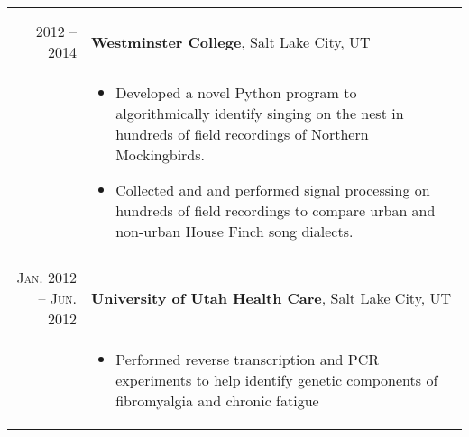 \documentclass[a4paper,10pt]{report}
\begin{document}
\begin{longtable}{r|p{10cm}}
{\begin{itemize}
		\end{itemize}
	} \vspace{-3.5mm}                                                                                     \\
	\multicolumn{2}{c}{}
	\\[-0.75em]
	\textsc{2012 -- 2014}            & \textbf{Westminster College}, Salt Lake City, UT                   \\
	                                 & \footnotesize{
		\vspace{-3.5mm}
		\begin{itemize}
			\setlength\itemsep{0em}
			\item Developed a novel Python program to algorithmically identify
			      singing on the nest in hundreds of field recordings of Northern Mockingbirds.
			\item Collected and and performed signal processing on hundreds of field recordings to compare urban
			      and non-urban House Finch song dialects.
		\end{itemize}
	} \vspace{-3.5mm}                                                                                     \\
	\multicolumn{2}{c}{}
	\\[-0.75em]
	\textsc{Jan. 2012 -- Jun. 2012}  & \textbf{University of Utah Health Care}, Salt Lake City, UT
	\\ & \footnotesize{
		\vspace{-3.5mm}
		\begin{itemize}
			\setlength\itemsep{0em}
			\item Performed reverse transcription and PCR experiments to help identify genetic components of fibromyalgia and chronic fatigue
		\end{itemize}
	} \vspace{-3.5mm}                                                                                     \\
\end{longtable}


\end{document}
